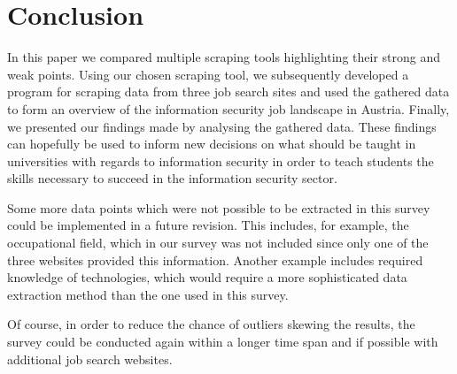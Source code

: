 \documentclass[runningheads]{llncs}
\begin{document}
\section{Conclusion}
\label{sec:conclusion}

In this paper we compared multiple scraping tools highlighting their strong and weak points. Using our chosen scraping tool, we subsequently developed a program for scraping data from three job search sites and used the gathered data to form an overview of the information security job landscape in Austria. Finally, we presented our findings made by analysing the gathered data. These findings can hopefully be used to inform new decisions on what should be taught in universities with regards to information security in order to teach students the skills necessary to succeed in the information security sector.

Some more data points which were not possible to be extracted in this survey could be implemented in a future revision. This includes, for example, the occupational field, which in our survey was not included since only one of the three websites provided this information. Another example includes required knowledge of technologies, which would require a more sophisticated data extraction method than the one used in this survey.

Of course, in order to reduce the chance of outliers skewing the results, the survey could be conducted again within a longer time span and if possible with additional job search websites.

\newpage
\printbibliography
\end{document}
